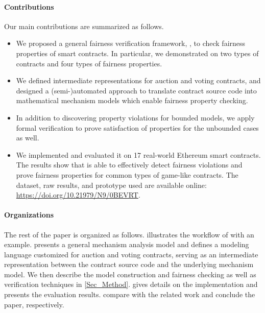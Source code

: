 \paragraph{Contributions}
Our main contributions are summarized as follows.
\begin{itemize}[leftmargin=*,topsep=4pt]
\item We proposed a general fairness verification framework, \tool, to check fairness properties of
smart contracts.
In particular, we demonstrated \tool on two types of contracts and four types of fairness
properties.
\item We defined intermediate representations for auction and voting contracts, and designed a
(semi-)automated approach to translate contract source code into mathematical mechanism models
which enable fairness property checking.
\item In addition to discovering property violations for bounded models, we apply formal
verification to prove satisfaction of properties for the unbounded cases as well.
\item We implemented \tool and evaluated it on 17 real-world Ethereum smart contracts.
  The results show that \tool is able to effectively detect fairness violations and prove fairness
  properties for common types of game-like contracts.
  The dataset, raw results, and prototype used are available online:
  \url{https://doi.org/10.21979/N9/0BEVRT}.
\end{itemize}

\paragraph{Organizations}
The rest of the paper is organized as follows.
 illustrates the workflow of \tool with an example.
 presents a general mechanism analysis model and defines a
modeling language customized for auction and voting contracts, serving as an intermediate
representation between the contract source code and the underlying mechanism model.
We then describe the model construction and fairness checking as well as verification techniques in
\cref{Sec_Method}.
 gives details on the implementation and presents the evaluation results.
 compare \tool with the related work and
conclude the paper, respectively.



